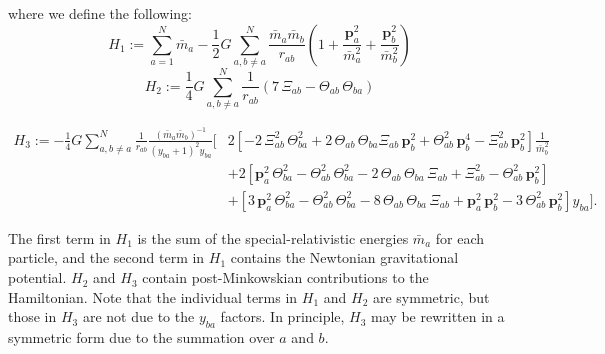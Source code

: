 \documentclass[aps,onecolumn,notitlepage,eqsecnum,nofootinbib,floatfix,superscriptaddress]{revtex4-1}
\begin{document}
\noindent where we define the following:
\begin{equation} \label{HamiltonianPart1}
  H_{1} := \sum_{a= 1}^{N}\bar{m}_{a}- \frac{1}{2}G\sum_{a,b\neq a}^{N}\frac{\bar{m}_{a}\bar{m}_{b}}{r_{ab}}\left(1+ \frac{\textbf{p}^{2}_{a}}{\bar{m}^{2}_{a}}+ \frac{\textbf{p}^{2}_{b}}{\bar{m}^{2}_{b}}\right)
\end{equation}
\begin{equation} \label{HamiltonianPart2}
  H_{2} := \frac{1}{4}G\sum_{a,b\neq a}^{N}\frac{1}{r_{ab}}\left(7 \, \Xi_{ab}- \Theta_{ab} \, \Theta_{ba}\right)
\end{equation}

\begin{widetext}
\begin{equation} \label{HamiltonianPart3}
\begin{aligned}
  H_{3} := -\frac{1}{4}G\sum_{a,b\neq a}^{N}\frac{1}{r_{ab}}\frac{\left(\bar{m}_a\bar{m}_b\right)^{-1}}{\left(y_{ba}+1\right)^{2}y_{ba}}\biggl[&2\left[-2 \, \Xi^{2}_{ab} \, \Theta^{2}_{ba}+ 2 \,\Theta_{ab} \, \Theta_{ba}\Xi_{ab} \, \mathbf{p}^{2}_{b}+ \Theta^{2}_{ab} \, \mathbf{p}^{4}_{b}- \Xi^{2}_{ab} \, \mathbf{p}^{2}_{b}\right]\frac{1}{\bar{m}^{2}_{b}} \\
         &+2\left[\mathbf{p}^{2}_{a} \, \Theta^{2}_{ba}- \Theta^{2}_{ab} \, \Theta^{2}_{ba}- 2 \, \Theta_{ab} \, \Theta_{ba} \, \Xi_{ab}+ \Xi^{2}_{ab}- \Theta^{2}_{ab} \, \mathbf{p}^{2}_{b}\right] \\
         &+\left[3\, \mathbf{p}^{2}_a \, \Theta^{2}_{ba}- \Theta^{2}_{ab} \, \Theta^{2}_{ba}- 8 \, \Theta_{ab} \, \Theta_{ba} \, \Xi_{ab}+ \mathbf{p}^{2}_{a} \, \mathbf{p}^{2}_{b}-3 \, \Theta^{2}_{ab} \, \mathbf{p}^{2}_{b}\right]y_{ba}\biggr]. \end{aligned}
\end{equation}
\end{widetext}

\noindent The first term in $H_1$ is the sum of the special-relativistic energies $\bar{m}_a$ for each particle, and the second term in $H_1$ contains the Newtonian gravitational potential. $H_2$ and $H_3$ contain post-Minkowskian contributions to the Hamiltonian. Note that the individual terms in $H_{1}$ and $H_{2}$ are symmetric, but those in $H_{3}$ are not due to the $y_{ba}$ factors. In principle, $H_{3}$ may be rewritten in a symmetric form due to the summation over $a$ and $b$.
\end{document}
